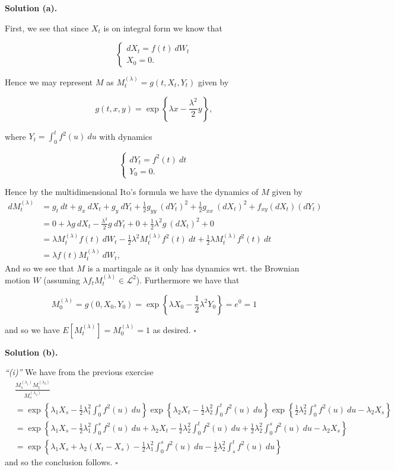 \documentclass[a4paper,12pt,openany]{book}
\begin{document}
\textbf{Solution (a).}

First, we see that since \(X_t\) is on integral form we know that

\[
\begin{cases}
dX_t=f(t)\ dW_t\\
X_0=0.
\end{cases}
\]

Hence we may represent \(M\) as \(M^{(\lambda)}_t=g(t,X_t,Y_t)\) given by

\[
g(t,x,y)=\exp\left\{\lambda x-\frac{\lambda^2}{2}y \right\},
\]

where \(Y_t=\int_0^t f^2(u)\ du\) with dynamics

\[
\begin{cases}
dY_t=f^2(t)\ dt\\
Y_0=0.
\end{cases}
\]

Hence by the multidimensional Ito's formula we have the dynamics of \(M\) given by
\begin{align*}
dM^{(\lambda)}_t&=g_t\ dt+g_x\ dX_t+g_y\ dY_t+\frac{1}{2}g_{yy}\ (dY_t)^2+\frac{1}{2}g_{xx}\ (dX_t)^2 +f_{xy}(dX_t)(dY_t)\\
&=0+\lambda g\ dX_t-\frac{\lambda^2}{2}g\ dY_t+0+\frac{1}{2}\lambda ^2g\ (dX_t)^2+0\\
&=\lambda M_t^{(\lambda)} f(t)\ dW_t-\frac{1}{2}\lambda^2M_t^{(\lambda)} f^2(t)\ dt+\frac{1}{2}\lambda M_t^{(\lambda)} f^2(t)\ dt\\
&=\lambda f(t)M_t^{(\lambda)}\ dW_t,
\end{align*}
And so we see that \(M\) is a martingale as it only has dynamics wrt. the Brownian motion \(W\) (assuming \(\lambda f_tM_t^{(\lambda)}\in\mathcal{L}^2\)). Furthermore we have that

\[
M_0^{(\lambda)}=g(0,X_0,Y_0)=\exp\left\{\lambda X_0-\frac{1}{2}\lambda ^2 Y_0\right\}=e^0=1
\]

and so we have \(E[M_t^{(\lambda)}]=M_0^{(\lambda)}=1\) as desired. \(\square\)

\textbf{Solution (b).}

\emph{``(i)''} We have from the previous exercise
\begin{align*}
&\frac{M^{(\lambda_1)}_sM^{(\lambda_2)}_t}{M^{(\lambda_2)}_s}\\
&=\exp\left\{\lambda_1 X_s-\frac{1}{2}\lambda_1^2\int_0^s f^2(u)\ du\right\}\exp\left\{\lambda_2 X_t-\frac{1}{2}\lambda_2^2\int_0^t f^2(u)\ du\right\}\exp\left\{\frac{1}{2}\lambda_2^2\int_0^s f^2(u)\ du-\lambda_2 X_s\right\}\\
&=\exp\left\{\lambda_1 X_s-\frac{1}{2}\lambda_1^2\int_0^s f^2(u)\ du+\lambda_2 X_t-\frac{1}{2}\lambda_2^2\int_0^t f^2(u)\ du+\frac{1}{2}\lambda_2^2\int_0^s f^2(u)\ du-\lambda_2 X_s\right\}\\
&=\exp\left\{\lambda_1 X_s+\lambda_2 (X_t-X_s)-\frac{1}{2}\lambda_1^2\int_0^s f^2(u)\ du-\frac{1}{2}\lambda_2^2\int_s^t f^2(u)\ du\right\}
\end{align*}
and so the conclusion follows. \(\square\)
\end{document}
